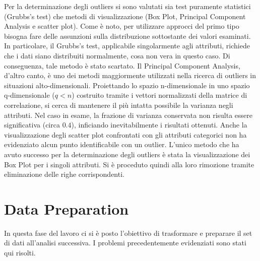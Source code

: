 \documentclass[english]{article}
\begin{document}
Per la determinazione degli outliers si sono valutati sia test puramente statistici (Grubbs's test) che metodi di visualizzazione (Box Plot, Principal Component Analysis e scatter plot). Come è noto, per utilizzare approcci del primo tipo bisogna fare delle assunzioni sulla distribuzione sottostante dei valori esaminati. In particolare, il Grubbs's test, applicabile singolarmente agli attributi, richiede che i dati siano distribuiti normalmente, cosa non vera in questo caso. Di conseguenza, tale metodo è stato scartato. 
Il Principal Component Analysis, d'altro canto, è uno dei metodi maggiormente utilizzati nella ricerca di outliers in situazioni alto-dimensionali. Proiettando lo spazio n-dimensionale in uno spazio q-dimensionale ($q<n$) costruito tramite i vettori normalizzati della matrice di correlazione, si cerca di mantenere il più intatta possibile la varianza negli attributi. Nel caso in esame, la frazione di varianza conservata non risulta essere significativa (circa $0.4$), inficiando inevitabilmente i risultati ottenuti.
Anche la visualizzazione degli scatter plot confrontati con gli attributi categorici non ha evidenziato alcun punto identificabile con un outlier.
L'unico metodo che ha avuto successo per la determinazione degli outliers è stata la visualizzazione dei Box Plot per i singoli attributi. Si è proceduto quindi alla loro rimozione tramite eliminazione delle righe corrispondenti.

\section{Data Preparation}
In questa fase del lavoro ci si è posto l'obiettivo di trasformare e preparare il set di dati all'analisi successiva. I problemi precedentemente evidenziati sono stati qui risolti.\\
\end{document}
